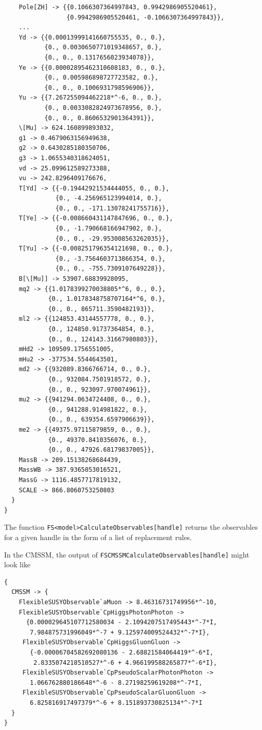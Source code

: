 \documentclass[final,3p,11pt,pdflatex]{elsarticle}
\newcommand{\code}[1]{\lstinline|#1|}  %
\begin{document}
\begin{example}
\begin{lstlisting}
    Pole[ZH] -> {{0.1066307364997843, 0.9942986905520461},
                 {0.9942986905520461, -0.1066307364997843}},
    ...
    Yd -> {{0.00013999141660755535, 0., 0.},
           {0., 0.0030650771019348657, 0.},
           {0., 0., 0.1317656023934078}},
    Ye -> {{0.00002895462310608183, 0., 0.},
           {0., 0.005986898727723582, 0.},
           {0., 0., 0.1006931798596906}},
    Yu -> {{7.267255094462218*^-6, 0., 0.},
           {0., 0.0033082824973678956, 0.},
           {0., 0., 0.8606532901364391}},
    \[Mu] -> 624.160899893032,
    g1 -> 0.4679063156949638,
    g2 -> 0.6430285180350706,
    g3 -> 1.0655340318624051,
    vd -> 25.099612589273388,
    vu -> 242.8296409176676,
    T[Yd] -> {{-0.19442921534444055, 0., 0.},
              {0., -4.256965123994014, 0.},
              {0., 0., -171.13078241755716}},
    T[Ye] -> {{-0.008660431147847696, 0., 0.},
              {0., -1.790668166947902, 0.},
              {0., 0., -29.953008563262035}},
    T[Yu] -> {{-0.008251796354121698, 0., 0.},
              {0., -3.7564603713866354, 0.},
              {0., 0., -755.7309107649228}},
    B[\[Mu]] -> 53907.68839928095,
    mq2 -> {{1.0178399270038805*^6, 0., 0.},
            {0., 1.0178348758707164*^6, 0.},
            {0., 0., 865711.3590482193}},
    ml2 -> {{124853.43144557778, 0., 0.},
            {0., 124850.91737364854, 0.},
            {0., 0., 124143.31667980803}},
    mHd2 -> 109509.1756551005,
    mHu2 -> -377534.5544643501,
    md2 -> {{932089.8366766714, 0., 0.},
            {0., 932084.7501918572, 0.},
            {0., 0., 923097.970074961}},
    mu2 -> {{941294.0634724408, 0., 0.},
            {0., 941288.914981822, 0.},
            {0., 0., 639354.6597906639}},
    me2 -> {{49375.97115879859, 0., 0.},
            {0., 49370.8410356076, 0.},
            {0., 0., 47926.68179837005}},
    MassB -> 209.15138268684439,
    MassWB -> 387.9365053016521,
    MassG -> 1116.4857717819132,
    SCALE -> 866.8060753250803
  }
}
\end{lstlisting}
\end{example}
%
The function \code{FS<model>CalculateObservables[handle]} returns the
observables for a given handle in the form of a list of replacement rules.
%
\begin{example}
  In the CMSSM, the output of \code{FSCMSSMCalculateObservables[handle]}
  might look like
%
\begin{lstlisting}
{
  CMSSM -> {
    FlexibleSUSYObservable`aMuon -> 8.46316731749956*^-10,
    FlexibleSUSYObservable`CpHiggsPhotonPhoton ->
      {0.000029645107712580034 - 2.1094207517495443*^-7*I,
       7.984875731996049*^-7 + 9.125974009524432*^-7*I},
     FlexibleSUSYObservable`CpHiggsGluonGluon ->
       {-0.00006704582692080136 - 2.68821584064419*^-6*I,
        2.8335074218510527*^-6 + 4.966199588265877*^-6*I},
     FlexibleSUSYObservable`CpPseudoScalarPhotonPhoton ->
       1.066762880186648*^-6 - 8.27198259619208*^-7*I,
     FlexibleSUSYObservable`CpPseudoScalarGluonGluon ->
       6.825816917497379*^-6 + 8.151893730825134*^-7*I
  }
}
\end{lstlisting}
\end{example}
\end{document}
